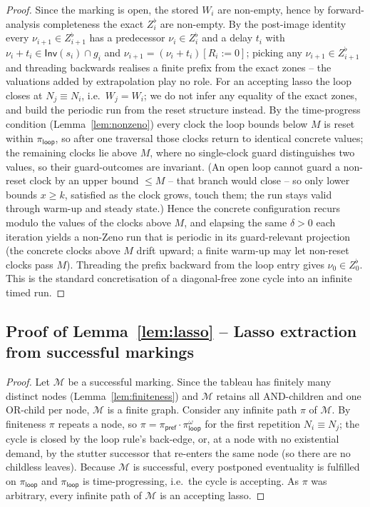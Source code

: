 \begin{proof}
Since the marking is open, the stored $W_i$ are non-empty, hence by forward-analysis completeness the exact $Z_i^{\flat}$ are non-empty. By the post-image identity every $\nu_{i+1}\in Z_{i+1}^{\flat}$ has a predecessor $\nu_i\in Z_i^{\flat}$ and a delay $t_i$ with $\nu_i+t_i\in\mathsf{Inv}(s_i)\cap g_i$ and $\nu_{i+1}=(\nu_i+t_i)[R_i:=0]$; picking any $\nu_{i+1}\in Z_{i+1}^{\flat}$ and threading backwards realises a finite prefix from the {exact} zones -- the valuations added by extrapolation play no role. For an accepting lasso the loop closes at $N_j\equiv N_i$, i.e.\ $W_j=W_i$; we do {not} infer any equality of the exact zones, and build the periodic run from the {reset structure} instead. By the time-progress condition (Lemma~\ref{lem:nonzeno}) every clock the loop bounds below $M$ is reset within $\pi_{\mathsf{loop}}$, so after one traversal those clocks return to identical concrete values; the remaining clocks lie above $M$, where no single-clock guard distinguishes two values, so their guard-outcomes are invariant. (An open loop cannot guard a non-reset clock by an upper bound $\le M$ -- that branch would close -- so only lower bounds $x\ge k$, satisfied as the clock grows, touch them; the run stays valid through warm-up and steady state.) Hence the concrete configuration recurs {modulo} the values of the clocks above $M$, and elapsing the same $\delta>0$ each iteration yields a non-Zeno run that is periodic in its guard-relevant projection (the concrete clocks above $M$ drift upward; a finite warm-up may let non-reset clocks pass $M$). Threading the prefix backward from the loop entry gives $\nu_0\in Z_0^{\flat}$. This is the standard concretisation of a diagonal-free zone cycle into an infinite timed run.
\end{proof}


\subsection{Proof of Lemma~\ref{lem:lasso} -- Lasso extraction from successful markings}
\begin{proof}
Let $\mathcal{M}$ be a successful marking. Since the tableau has finitely many distinct nodes (Lemma~\ref{lem:finiteness}) and $\mathcal{M}$ retains all AND-children and one OR-child per node, $\mathcal{M}$ is a finite graph. Consider any infinite path $\pi$ of $\mathcal{M}$. By finiteness $\pi$ repeats a node, so $\pi=\pi_{\mathsf{pref}}\cdot\pi_{\mathsf{loop}}^\omega$ for the first repetition $N_i\equiv N_j$; the cycle is closed by the loop rule's back-edge, or, at a node with no existential demand, by the stutter successor that re-enters the same node (so there are no childless leaves). Because $\mathcal{M}$ is successful, every postponed eventuality is fulfilled on $\pi_{\mathsf{loop}}$ and $\pi_{\mathsf{loop}}$ is time-progressing, i.e.\ the cycle is accepting. As $\pi$ was arbitrary, every infinite path of $\mathcal{M}$ is an accepting lasso.
\end{proof}


